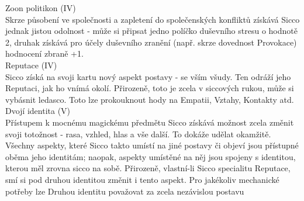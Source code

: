 \documentclass[../main.tex]{subfiles}
\begin{document}
Zoon politikon (IV)\\
Skrze působení ve společnosti a zapletení do společenských konfliktů získává Sicco jednak jistou odolnost - může si připsat jedno políčko duševního stresu o hodnotě 2, druhak získává pro účely duševního zranění (např. skrze dovednost Provokace) hodnocení zbraně +1.\\

Reputace (IV) \\
Sicco získá na svoji kartu nový aspekt postavy - se vším všudy. Ten odráží jeho Reputaci, jak ho vnímá okolí. Přirozeně, toto je zcela v siccových rukou, může si vybásnit ledasco. Toto lze prokouknout hody na Empatii, Vztahy, Kontakty atd.\\

Dvojí identita (V)\\
Přístupem k mocnému magickému předmětu Sicco získává možnost zcela změnit svoji totožnost - rasa, vzhled, hlas a vše další. To dokáže udělat okamžitě. Všechny aspekty, které Sicco takto umístí na jiné postavy či objeví jsou přístupné oběma jeho identitám; naopak, aspekty umístěné na něj jsou spojeny s identitou, kterou měl zrovna sicco na sobě. Přirozeně, vlastní-li Sicco specialitu Reputace, smí si pod druhou identitou změnit i tento aspekt. Pro jakékoliv mechanické potřeby lze Druhou identitu považovat za zcela nezávislou postavu
\end{document}
